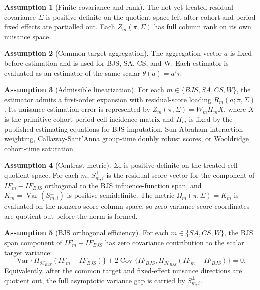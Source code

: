 \documentclass[11pt]{article}
\theoremstyle{definition}
\newtheorem{assumption}{Assumption}
\theoremstyle{plain}
\theoremstyle{remark}
\begin{document}
\begin{assumption}[Finite covariance and rank]\label{ass:rank}
The not-yet-treated residual covariance \(\Sigma\) is positive definite on the quotient space left after cohort and period fixed effects are partialled out. Each \(Z_m(\pi,\Sigma)\) has full column rank on its own nuisance space.
\end{assumption}

\begin{assumption}[Common target aggregation]\label{ass:common-target}
The aggregation vector \(a\) is fixed before estimation and is used for BJS, SA, CS, and W. Each estimator is evaluated as an estimator of the same scalar \(\theta(a)=a'\tau\).
\end{assumption}

\begin{assumption}[Admissible linearization]\label{ass:linearization}
For each \(m\in\{BJS,SA,CS,W\}\), the estimator admits a first-order expansion with residual-score loading \(R_m(a;\pi,\Sigma)\). Its nuisance estimation error is represented by \(Z_m(\pi,\Sigma)=W_mH_mX\), where \(X\) is the primitive cohort-period cell-incidence matrix and \(H_m\) is fixed by the published estimating equations for BJS imputation, Sun-Abraham interaction-weighting, Callaway-Sant'Anna group-time doubly robust scores, or Wooldridge cohort-time saturation.
\end{assumption}

\begin{assumption}[Contrast metric]\label{ass:omega}
\(\Sigma_\tau\) is positive definite on the treated-cell quotient space. For each \(m\), \(S_{m,i}^{\perp}\) is the residual-score vector for the component of \(IF_m-IF_{BJS}\) orthogonal to the BJS influence-function span, and \(K_m=\operatorname{Var}(S_{m,i}^{\perp})\) is positive semidefinite. The metric \(\Omega_m(\pi,\Sigma)=K_m\) is evaluated on the nonzero score column space, so zero-variance score coordinates are quotient out before the norm is formed.
\end{assumption}

\begin{assumption}[BJS orthogonal efficiency]\label{ass:bjs-orthogonal}
For each \(m\in\{SA,CS,W\}\), the BJS span component of \(IF_m-IF_{BJS}\) has zero covariance contribution to the scalar target variance:
\[
\operatorname{Var}\{\Pi_{\mathcal H_{BJS}}(IF_m-IF_{BJS})\}
+2\operatorname{Cov}\{IF_{BJS},\Pi_{\mathcal H_{BJS}}(IF_m-IF_{BJS})\}=0.
\]
Equivalently, after the common target and fixed-effect nuisance directions are quotient out, the full asymptotic variance gap is carried by \(S_{m,i}^{\perp}\).
\end{assumption}
\end{document}
